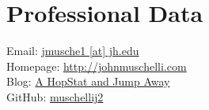 \section{Professional Data}

Email: \href{mailto:jmusche1@jh.edu}{jmusche1 [at] jh.edu} \\                      %
Homepage: \href{http://johnmuschelli.com}{http://johnmuschelli.com}\\
Blog: \href{https://hopstat.wordpress.com/}{A HopStat and Jump Away} \\ %
GitHub: \href{https://github.com/muschellij2}{muschellij2} \\
